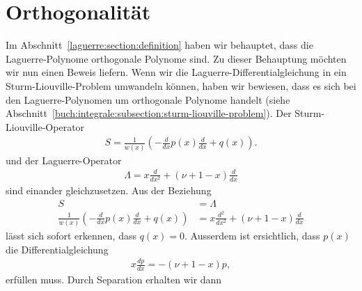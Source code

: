%
%
%


\section{Orthogonalität
  \label{laguerre:section:orthogonal}}
Im Abschnitt~\ref{laguerre:section:definition} haben wir behauptet,
dass die Laguerre-Polynome orthogonale Polynome sind.
Zu dieser Behauptung möchten wir nun einen Beweis liefern.
Wenn wir die Laguerre\--Differentialgleichung in ein
Sturm\--Liouville\--Problem umwandeln können, haben wir bewiesen, dass es sich
bei
den Laguerre\--Polynomen um orthogonale Polynome handelt (siehe
Abschnitt~\ref{buch:integrale:subsection:sturm-liouville-problem}).
Der Sturm-Liouville-Operator
\begin{align}
S
=
\frac{1}{w(x)} \left(-\frac{d}{dx}p(x) \frac{d}{dx} + q(x) \right).
\label{laguerre:slop}
\end{align}
und der Laguerre-Operator
\begin{align}
\Lambda
=
x \frac{d}{dx^2} + (\nu + 1 -x) \frac{d}{dx}
\end{align}
sind einander gleichzusetzen.
Aus der Beziehung
\begin{align}
S
 & =
\Lambda
\nonumber
\\
\frac{1}{w(x)} \left(-\frac{d}{dx}p(x) \frac{d}{dx} + q(x) \right)
 & =
x \frac{d^2}{dx^2} + (\nu + 1 - x) \frac{d}{dx}
\label{laguerre:sl-lag}
\end{align}
lässt sich sofort erkennen, dass $q(x) = 0$.
Ausserdem ist ersichtlich, dass $p(x)$ die Differentialgleichung
\begin{align*}
x \frac{dp}{dx}
=
-(\nu + 1 - x) p,
\end{align*}
erfüllen muss.
Durch Separation erhalten wir dann

